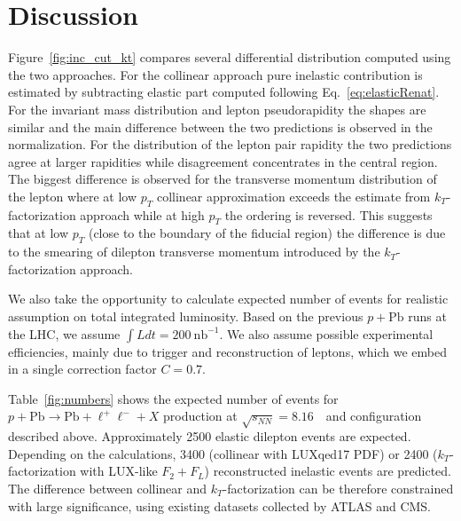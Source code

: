 \clearpage
\section{Discussion}
\label{sec:discussion}

Figure~\ref{fig:inc_cut_kt} compares several differential distribution computed using the two approaches. For the collinear approach pure inelastic contribution is estimated by
subtracting elastic part computed following Eq.~\ref{eq:elasticRenat}.
For the invariant mass distribution and lepton pseudorapidity the shapes are similar and
the main difference between the two predictions is observed in the normalization.
For the distribution of the lepton pair rapidity the two predictions agree at larger rapidities while disagreement concentrates
in the central region. The biggest difference is observed for the transverse momentum distribution of the lepton where at low $p_T$ collinear approximation exceeds the estimate
from $k_T$-factorization approach while at high $p_T$ the ordering is reversed.  
This suggests that at low $p_T$ (close to the boundary of the fiducial region) the difference is due to the smearing of dilepton transverse momentum introduced by the $k_T$-factorization approach.

We also take the opportunity to calculate expected number of events for realistic assumption on total integrated luminosity.
Based on the previous $p+\textrm{Pb}$ runs at the LHC, we assume  $\int Ldt= 200~\textrm{nb}^{-1}$.
We also assume possible experimental efficiencies, mainly due to trigger and reconstruction of leptons, which we embed in a single correction factor $C=0.7$.

Table~\ref{fig:numbers} shows the expected number of events for $p+\textrm{Pb}\rightarrow \textrm{Pb} + \ell^+\ell^- + X$ production at $\sqrt{s_{N N}} = 8.16$~\TeV\ and configuration described above. 
Approximately 2500 elastic dilepton events are expected. 
Depending on the calculations, 3400 (collinear with LUXqed17 PDF) or 2400 ($k_T$-factorization with LUX-like $F_2+F_L$) reconstructed inelastic events are predicted. The difference between collinear and $k_T$-factorization can be therefore constrained with large significance, using existing datasets collected by ATLAS and CMS.



